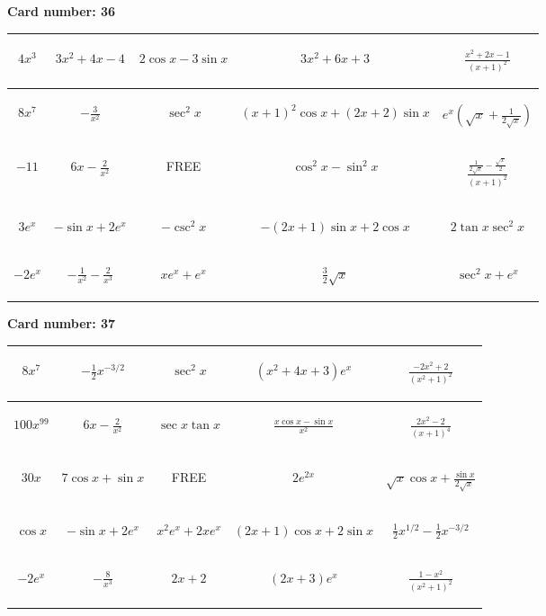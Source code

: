 \documentclass{article}
\newcommand{\entry}[1]{\begin{minipage}[t][2.75cm][t]{4cm} \vspace{1cm} \begin{center}#1\end{center} \end{minipage}}
\newcommand{\freespace}{\entry{FREE}}
\newcommand{\cardnumber}[1]{\noindent \textbf{Card number: #1} \bigskip}
\begin{document}
\pagebreak

\cardnumber{36}
\begin{center}
\begin{tabular}{|*{5}{c|}}
    \hline
    \entry{$4x^3$} & \entry{$3x^2 + 4x - 4$} & \entry{$2 \cos x - 3 \sin x$} & \entry{$3x^2 + 6x + 3$} & \entry{$\frac{x^2 + 2x - 1}{(x + 1)^2}$} \\ \hline
    \entry{$8x^7$} & \entry{$-\frac{3}{x^2}$} & \entry{$\sec^2 x$} & \entry{$(x + 1)^2 \cos x + (2x + 2) \sin x$} & \entry{$e^x \left(\sqrt{x} + \frac{1}{2\sqrt{x}}\right)$} \\ \hline
    \entry{$-11$} & \entry{$6x - \frac{2}{x^2}$} & \freespace & \entry{$\cos^2 x - \sin^2 x$} & \entry{$\frac{\frac{1}{2 \sqrt{x}} - \frac{\sqrt{x}}{2}}{(x + 1)^2}$} \\ \hline
    \entry{$3e^x$} & \entry{$-\sin x + 2e^x$} & \entry{$-\csc^2 x$} & \entry{$-(2x + 1) \sin x + 2 \cos x$} & \entry{$2 \tan x \sec^2 x$} \\ \hline
    \entry{$-2e^x$} & \entry{$-\frac{1}{x^2} - \frac{2}{x^3}$} & \entry{$x e^x + e^x$} & \entry{$\frac{3}{2} \sqrt{x}$} & \entry{$\sec^2 x + e^x$} \\ \hline
\end{tabular}
\end{center}

\pagebreak

\cardnumber{37}
\begin{center}
\begin{tabular}{|*{5}{c|}}
    \hline
    \entry{$8x^7$} & \entry{$-\frac{1}{2} x^{-3/2}$} & \entry{$\sec^2 x$} & \entry{$(x^2 + 4x + 3) e^x$} & \entry{$\frac{-2x^2 + 2}{(x^2 + 1)^2}$} \\ \hline
    \entry{$100x^{99}$} & \entry{$6x - \frac{2}{x^2}$} & \entry{$\sec x \tan x$} & \entry{$\frac{x \cos x - \sin x}{x^2}$} & \entry{$\frac{2x^2 - 2}{(x + 1)^4}$} \\ \hline
    \entry{$30x$} & \entry{$7 \cos x + \sin x$} & \freespace & \entry{$2e^{2x}$} & \entry{$\sqrt{x} \cos x + \frac{\sin x}{2 \sqrt{x}}$} \\ \hline
    \entry{$\cos x$} & \entry{$-\sin x + 2e^x$} & \entry{$x^2 e^x + 2x e^x$} & \entry{$(2x + 1) \cos x + 2 \sin x$} & \entry{$\frac{1}{2} x^{1/2} - \frac{1}{2} x^{-3/2}$} \\ \hline
    \entry{$-2e^x$} & \entry{$-\frac{8}{x^3}$} & \entry{$2x + 2$} & \entry{$(2x + 3) e^x$} & \entry{$\frac{1 - x^2}{(x^2 + 1)^2}$} \\ \hline
\end{tabular}
\end{center}
\end{document}
